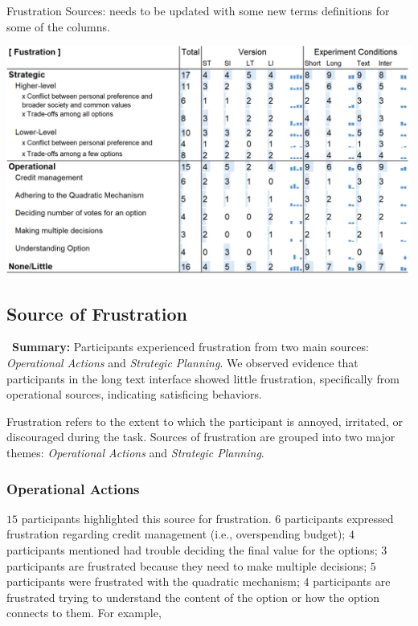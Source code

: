 \begin{table}[h]
    \caption{Frustration Sources: needs to be updated with some new terms definitions for some of the columns.}
    \label{tbl:fustration}
    \includegraphics[width=\linewidth]{content/image/cog/fustration_table.png}
\end{table}
\subsection{Source of Frustration} 
\label{sec:fustration}

\vspace{5pt}
\begin{tldrbox}
    \faInfoCircle~\xspace\textbf{Summary:} Participants experienced frustration from two main sources: \textit{Operational Actions} and \textit{Strategic Planning}. We observed evidence that participants in the long text interface showed little frustration, specifically from operational sources, indicating satisficing behaviors.
\end{tldrbox}

Frustration refers to the extent to which the participant is annoyed, irritated, or discouraged during the task. Sources of frustration are grouped into two major themes: \textit{Operational Actions} and \textit{Strategic Planning}.

\subsubsection{Operational Actions} 
$15$ participants highlighted this source for frustration. $6$ participants expressed frustration regarding credit management (i.e., overspending budget); $4$ participants mentioned had trouble deciding the final value for the options; $3$ participants are frustrated because they need to make multiple decisions; $5$ participants were frustrated with the quadratic mechanism; $4$ participants are frustrated trying to understand the content of the option or how the option connects to them. For example, 

